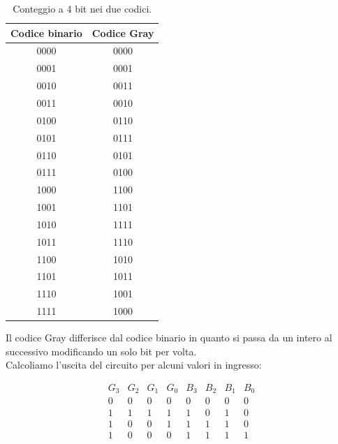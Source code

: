 \documentclass[10pt, a4paper, italian]{article}
\begin{document}
\begin{table}[htbp]
    \centering
    \begin{tabular}{c||c}
        Codice binario & Codice Gray \\
        \hline
        \hline
        0000 & 0000\\
        0001 & 0001\\
        0010 & 0011\\
        0011 & 0010\\
        0100 & 0110\\
        0101 & 0111\\
        0110 & 0101\\
        0111 & 0100\\
        1000 & 1100\\
        1001 & 1101\\
        1010 & 1111\\
        1011 & 1110\\
        1100 & 1010\\
        1101 & 1011\\
        1110 & 1001\\
        1111 & 1000\\
        \end{tabular}
    \caption{Conteggio a 4 bit nei due codici.}
    \label{tab: grbin}
\end{table}

Il codice Gray differisce dal codice binario in quanto si passa da un intero al successivo modificando un solo bit per volta.\\
Calcoliamo l'uscita del circuito per alcuni valori in ingresso:
\begin{table}[htbp]
    \centering
    \[
    \begin{array}{cccc|cccc}
        G_3 & G_2 & G_1 & G_0 & B_3 & B_2 & B_1 & B_0\\
        \hline
        0 & 0 & 0 & 0 & 0 & 0 & 0 & 0\\
        1 & 1 & 1 & 1 & 1 & 0 & 1 & 0\\
        1 & 0 & 0 & 1 & 1 & 1 & 1 & 0\\
        1 & 0 & 0 & 0 & 1 & 1 & 1 & 1\\
    \end{array}
    \]
\end{table}
\end{document}
